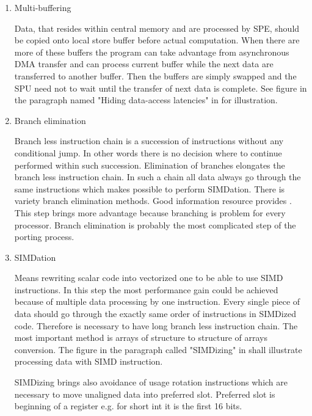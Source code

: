 \begin{enumerate}
\item{Multi-buffering}
\par
Data, that resides within central memory and are processed by SPE, should be copied onto local store buffer before actual computation.
When there are more of these buffers the program can take advantage from asynchronous DMA transfer and can process current buffer while the next data are transferred to another buffer.
Then the buffers are simply swapped and the SPU need not to wait until the transfer of next data is complete.
See figure in the paragraph named "Hiding data-access latencies" in \cite{compilerOptions} for illustration.

\item{Branch elimination}
\par
Branch less instruction chain is a succession of instructions without any conditional jump.
In other words there is no decision where to continue performed within such succession.
Elimination of branches elongates the branch less instruction chain.
In such a chain all data always go through the same instructions which makes possible to perform SIMDation.
There is variety branch elimination methods.
Good information resource provides \cite{cellPerformance}.
This step brings more advantage because branching is problem for every processor.
Branch elimination is probably the most complicated step of the porting process.

\item{SIMDation}
\par
Means rewriting scalar code into vectorized one to be able to use SIMD instructions.
In this step the most performance gain could be achieved because of multiple data processing by one instruction.
Every single piece of data should go through the exactly same order of instructions in SIMDized code.
Therefore is necessary to have long branch less instruction chain.
The most important method is arrays of structure to structure of arrays conversion.
The figure in the paragraph called "SIMDizing" in \cite{compilerOptions} shall illustrate processing data with SIMD instruction.

\par
SIMDizing brings also avoidance of usage rotation instructions which are necessary to move unaligned data into preferred slot.
Preferred slot is beginning of a register e.g. for short int it is the first 16 bits.


\end{enumerate}
